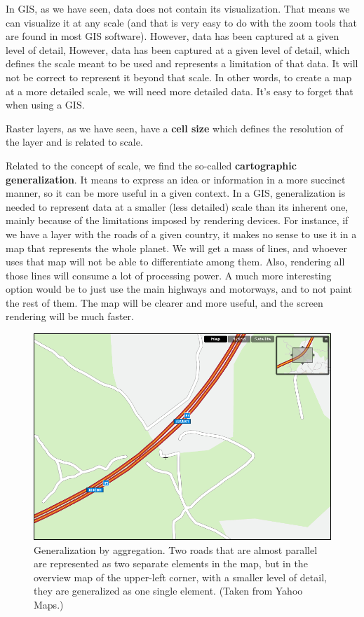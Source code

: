 In GIS, as we have seen, data does not contain its visualization. That means we can visualize it at any scale (and that is very easy to do with the zoom tools that are found in most GIS software). However, data has been captured at a given level of detail, However, data has been captured at a given level of detail, which defines the scale meant to be used and represents a limitation of that data. It will not be correct to represent it beyond that scale. In other words, to create a map at a more detailed scale, we will need more detailed data. It's easy to forget that when using a GIS.

Raster layers, as we have seen, have a \textbf{cell size} which defines the resolution of the layer and is related to scale.

Related to the concept of scale, we find the so-called \textbf{cartographic generalization}. It means to express an idea or information in a more succinct manner, so it can be more useful in a given context. In a GIS, generalization is needed to represent data at a smaller (less detailed) scale than its inherent one, mainly because of the limitations imposed by rendering devices. For instance, if we have a layer with the roads of a given country, it makes no sense to use it in a map that represents the whole planet. We will get a mass of lines, and whoever uses that map will not be able to differentiate among them. Also, rendering all those lines will consume a lot of processing power. A much more interesting option would be to just use the main highways and motorways, and to not paint the rest of them. The map will be clearer and more useful, and the screen rendering will be much faster.

\begin{figure}[!hbt]
\centering
\includegraphics[width=.75\columnwidth]{Cartography/Generalization_aggregation.png}
\caption{\small Generalization by aggregation. Two roads that are almost parallel are represented as two separate elements in the map, but in the overview map of the upper-left corner, with a smaller level of detail, they are generalized as one single element. (Taken from Yahoo Maps.)}
\label{Fig:Generalization_aggregation} 
\end{figure}


